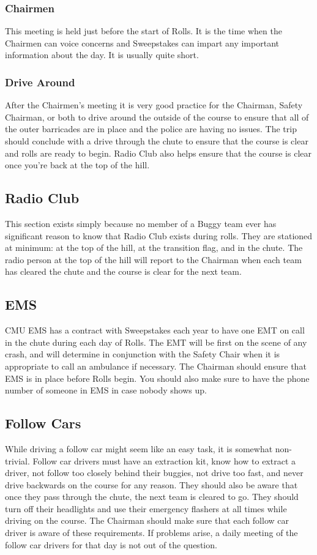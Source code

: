 \subsubsection{Chairmen}
This meeting is held just before the start of Rolls. It is the time when
the Chairmen can voice concerns and Sweepstakes can impart any important
information about the day. It is usually quite short.

\subsubsection{Drive Around}
After the Chairmen's meeting it is very good practice for the Chairman,
Safety Chairman, or both to drive around the outside of the course to ensure
that all of the outer barricades are in place and the police are having no
issues. The trip should conclude with a drive through the chute to ensure that
the course is clear and rolls are ready to begin. Radio Club also helps
ensure that the course is clear once you're back at the top of the hill.

\subsection{Radio Club}
This section exists simply because no member of a Buggy team ever has
significant reason to know that Radio Club exists during rolls.
They are stationed at minimum: at the top of the hill, at the transition
flag, and in the chute. The radio person at the top of the hill will report to
the Chairman when each team has cleared the chute and the course is clear
for the next team.

\subsection{EMS}
CMU EMS has a contract with Sweepstakes each year to have one EMT on call
in the chute during each day of Rolls. The EMT will be first
on the scene of any crash, and will determine in conjunction with the
Safety Chair when it is appropriate to call an ambulance if necessary.
The Chairman should ensure that EMS is in place before Rolls begin. You
should also make sure to have the phone number of someone in EMS in case
nobody shows up.

\subsection{Follow Cars}
While driving a follow car might seem like an easy task, it is somewhat
non-trivial. Follow car drivers must have an extraction kit, know how to
extract a driver, not follow too closely behind their buggies, not drive too
fast, and never drive backwards on the course for any reason. They should also
be aware that once they pass through the chute, the next team is cleared to
go. They should turn off their headlights and use their emergency flashers
at all times while driving on the course. The Chairman should make sure that
each follow car driver is aware of these requirements. If problems arise,
a daily meeting of the follow car drivers for that day is not out of the
question.

